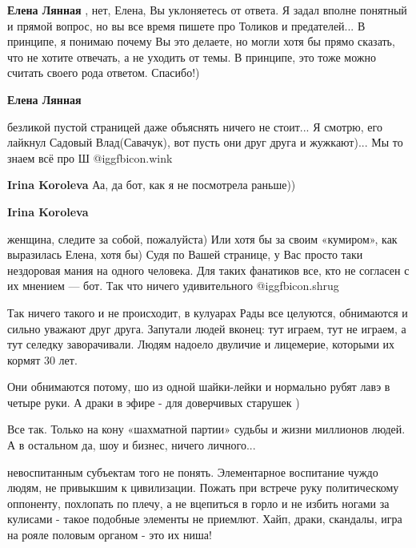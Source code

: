\begin{itemize}
\begin{itemize}
\textbf{Елена Лянная} , нет, Елена, Вы уклоняетесь от ответа. Я задал вполне понятный и прямой вопрос, но вы все время пишете про Толиков и предателей... В принципе, я понимаю почему Вы это делаете, но могли хотя бы прямо сказать, что не хотите отвечать, а не уходить от темы. В принципе, это тоже можно считать своего рода ответом. Спасибо!)

\textbf{Елена Лянная} 

безликой пустой страницей даже объяснять ничего не стоит... Я смотрю, его
лайкнул Садовый Влад(Савачук), вот пусть они друг друга и жужкают)... Мы то
знаем всё про Ш @igg{fbicon.wink} 

\textbf{Irina Koroleva} Аа, да бот, как я не посмотрела раньше))

\textbf{Irina Koroleva} 

женщина, следите за собой, пожалуйста) Или хотя бы за своим «кумиром», как
выразилась Елена, хотя бы) Судя по Вашей странице, у Вас просто таки нездоровая
мания на одного человека. Для таких фанатиков все, кто не согласен с их мнением
— бот. Так что ничего удивительного  @igg{fbicon.shrug} 

\end{itemize} %


Так ничего такого и не происходит, в кулуарах Рады все целуются, обнимаются и
сильно уважают друг друга. Запутали людей вконец: тут играем, тут не играем, а
тут селедку заворачивали. Людям надоело двуличие и лицемерие, которыми их
кормят 30 лет.


Они обнимаются потому, шо из одной шайки-лейки и нормально рубят лавэ в четыре
руки. А драки в эфире - для доверчивых старушек )


Все так. Только на кону «шахматной партии» судьбы и жизни миллионов людей. А в
остальном да, шоу и бизнес, ничего личного...


невоспитанным субъектам того не понять. Элементарное воспитание чуждо людям, не
привыкшим к цивилизации. Пожать при встрече руку политическому оппоненту,
похлопать по плечу, а не вцепиться в горло и не избить ногами за кулисами -
такое подобные элементы не приемлют. Хайп, драки, скандалы, игра на рояле
половым органом - это их ниша!


\end{itemize}
